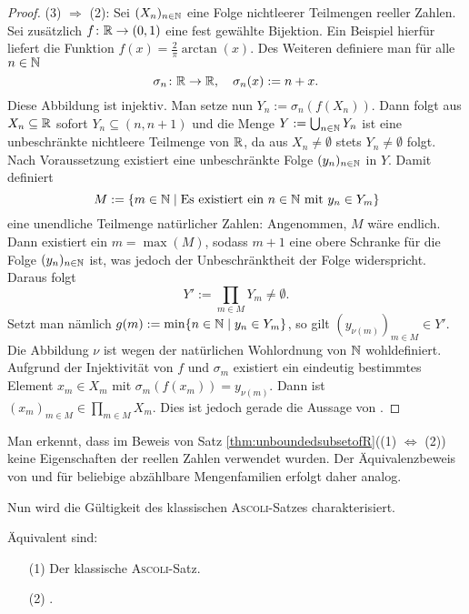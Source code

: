 \begin{proof}
  (3) $\Rightarrow$ (2):
  Sei $(X_n)_{n \in \mathbb{N}}$ eine Folge nichtleerer Teilmengen reeller Zahlen.
  Sei zusätzlich $f \colon \mathbb{R} \to (0,1)$ eine fest gewählte Bijektion.
  Ein Beispiel hierfür liefert die Funktion $f(x) = \frac{2}{\pi}\arctan(x)$.
  Des Weiteren definiere man für alle $n \in \mathbb{N}$
  \begin{displaymath}
    \sigma_n \colon \mathbb{R} \to \mathbb{R}, \quad \sigma_n(x) := n + x.
  \end{displaymath}
  Diese Abbildung ist injektiv.
  Man setze nun $Y_n := \sigma_n(f(X_n))$. 
  Dann folgt aus $X_n \subseteq \mathbb{R}$ sofort $Y_n \subseteq (n,n+1)$ und die Menge $Y:= \bigcup_{n \in \mathbb{N}} Y_n$ ist eine unbeschränkte nichtleere Teilmenge von $\mathbb{R}$, da aus $X_n \neq \emptyset$ stets $Y_n \neq \emptyset$ folgt.
  Nach Voraussetzung existiert eine unbeschränkte Folge $(y_n)_{n \in \mathbb{N}}$ in $Y$.
  Damit definiert
  \begin{displaymath}
    M := \{m \in \mathbb{N} \mid \text{Es existiert ein } n \in \mathbb{N} \text{ mit } y_n \in Y_m\}
  \end{displaymath}
  eine unendliche Teilmenge natürlicher Zahlen:
  Angenommen, $M$ wäre endlich.
  Dann existiert ein $m = \max(M)$, sodass $m + 1$ eine obere Schranke für die Folge $(y_n)_{n \in \mathbb{N}}$ ist, was jedoch der Unbeschränktheit der Folge widerspricht.
  Daraus folgt 
  \begin{displaymath}
    Y' := \prod_{m \in M} Y_m \neq \emptyset. 
  \end{displaymath}
  Setzt man nämlich $g(m) := \min\{n \in \mathbb{N} \mid y_n \in Y_m\}$, so gilt $(y_{\nu(m)})_{m \in M} \in Y'$.
  Die Abbildung $\nu$ ist wegen der natürlichen Wohlordnung von $\mathbb{N}$ wohldefiniert.
  Aufgrund der Injektivität von $f$ und $\sigma_m$ existiert ein eindeutig bestimmtes Element $x_m \in X_m$ mit $\sigma_m(f(x_m)) =   y_{\nu(m)}$.
  Dann ist $(x_m)_{m \in M} \in \prod_{m \in M} X_m$.
  Dies ist jedoch gerade die Aussage von \PCCR.
\end{proof}

\begin{bem}
  Man erkennt, dass im Beweis von Satz \ref{thm:unboundedsubsetofR}((1) $\Leftrightarrow$ (2)) keine Eigenschaften der reellen Zahlen verwendet wurden. Der Äquivalenzbeweis von \CC und \PCC für beliebige abzählbare Mengenfamilien erfolgt daher analog.
\end{bem}

Nun wird die Gültigkeit des klassischen \textsc{Ascoli}-Satzes charakterisiert.

\begin{thm}
  \label{thm:classicalascoli}
  Äquivalent sind:
  \begin{enumerate}
    \item[(1)] Der klassische \textsc{Ascoli}-Satz.
    \item[(2)] \CCR.
  \end{enumerate}
\end{thm}

